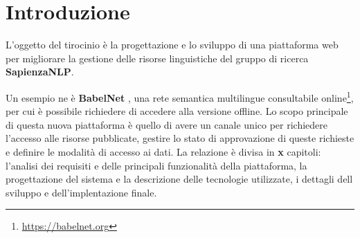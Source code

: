 
\chapter{Introduzione}

L'oggetto del tirocinio è la progettazione e lo sviluppo di una piattaforma web
per migliorare la gestione delle risorse linguistiche del gruppo di ricerca \textbf{SapienzaNLP}.

Un esempio ne è \textbf{BabelNet} \cite{NavigliPonzetto:12aij}, una rete
semantica multilingue consultabile online\footnote{\url{https://babelnet.org}},
per cui è possibile richiedere di accedere alla versione offline.
Lo scopo principale di questa nuova piattaforma è quello di avere un canale unico
per richiedere l'accesso alle risorse pubblicate, gestire lo stato di
approvazione di queste richieste e definire le modalità di accesso ai dati.
\newline
\newline
La relazione è divisa in {\textbf{\color{red}x}} capitoli:
l'analisi dei requisiti e delle principali funzionalità della piattaforma,
la progettazione del sistema e la descrizione delle tecnologie utilizzate,
i dettagli dell sviluppo e dell'implentazione finale.